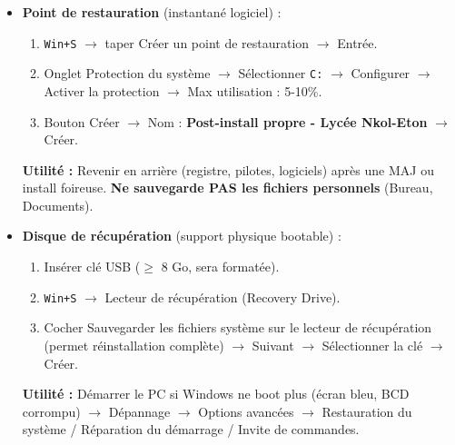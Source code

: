 \documentclass[11pt]{article}
\begin{document}
\begin{exoresolu}
\begin{itemize}
  \item \textbf{Point de restauration} (instantané logiciel) :
        \begin{enumerate}
          \item \texttt{Win+S} $\rightarrow$ taper \og Créer un point de restauration \fg $\rightarrow$ Entrée.
          \item Onglet \og Protection du système \fg $\rightarrow$ Sélectionner \texttt{C:} $\rightarrow$ \og Configurer \fg $\rightarrow$ Activer la protection $\rightarrow$ Max utilisation : 5-10\%.
          \item Bouton \og Créer \fg $\rightarrow$ Nom : \og \textbf{Post-install propre - Lycée Nkol-Eton} \fg $\rightarrow$ Créer.
        \end{enumerate}
        \textbf{Utilité :} Revenir en arrière (registre, pilotes, logiciels) après une MAJ ou install foireuse. \textbf{Ne sauvegarde PAS les fichiers personnels} (Bureau, Documents).
  
  \item \textbf{Disque de récupération} (support physique bootable) :
        \begin{enumerate}
          \item Insérer clé USB ($\ge$ 8 Go, sera formatée).
          \item \texttt{Win+S} $\rightarrow$ \og Lecteur de récupération \fg (Recovery Drive).
          \item Cocher \og Sauvegarder les fichiers système sur le lecteur de récupération \fg (permet réinstallation complète) $\rightarrow$ Suivant $\rightarrow$ Sélectionner la clé $\rightarrow$ Créer.
        \end{enumerate}
        \textbf{Utilité :} Démarrer le PC si Windows ne boot plus (écran bleu, BCD corrompu) $\rightarrow$ Dépannage $\rightarrow$ Options avancées $\rightarrow$ Restauration du système / Réparation du démarrage / Invite de commandes.
\end{itemize}


\end{exoresolu}
\end{document}
